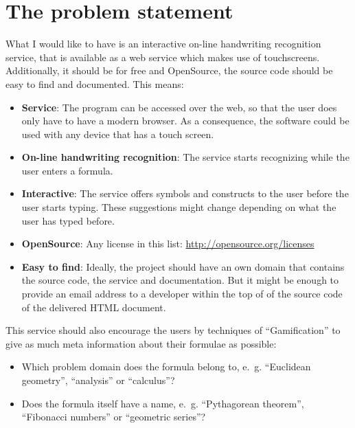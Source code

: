 \documentclass[a4paper]{scrartcl}
\begin{document}
\section{The problem statement}
    What I would like to have is an interactive on-line handwriting
    recognition service, that is available as a web service which makes
    use of touchscreens. Additionally, it should be for free and
    OpenSource, the source code should be easy to find and documented.
    This means:
    \begin{itemize}
        \item \textbf{Service}: The program can be accessed over the web, so
              that the user does only have to have a modern browser.
              As a consequence, the software could be used with any
              device that has a touch screen.
        \item \textbf{On-line handwriting recognition}: The service
              starts recognizing while the user enters a formula.
        \item \textbf{Interactive}: The service offers symbols and constructs
              to the user before the user starts typing. These suggestions
              might change depending on what the user has typed before.
        \item \textbf{OpenSource}: Any license in this list: \href{http://opensource.org/licenses}{http://opensource.org/licenses}
        \item \textbf{Easy to find}: Ideally, the project should have
              an own domain that contains the source code, the service
              and documentation. But it might be enough to provide
              an email address to a developer within the top of
              of the source code of the delivered HTML document.
    \end{itemize}

    This service should also encourage the users by techniques
    of \enquote{Gamification} to give as much
    meta information about their formulae as possible:
    \begin{itemize}
        \item Which problem domain does the formula belong to, e.~g. \enquote{Euclidean geometry}, \enquote{analysis} or \enquote{calculus}?
        \item Does the formula itself have a name, e.~g. \enquote{Pythagorean theorem}, \enquote{Fibonacci numbers} or \enquote{geometric series}?
    \end{itemize}
\end{document}

